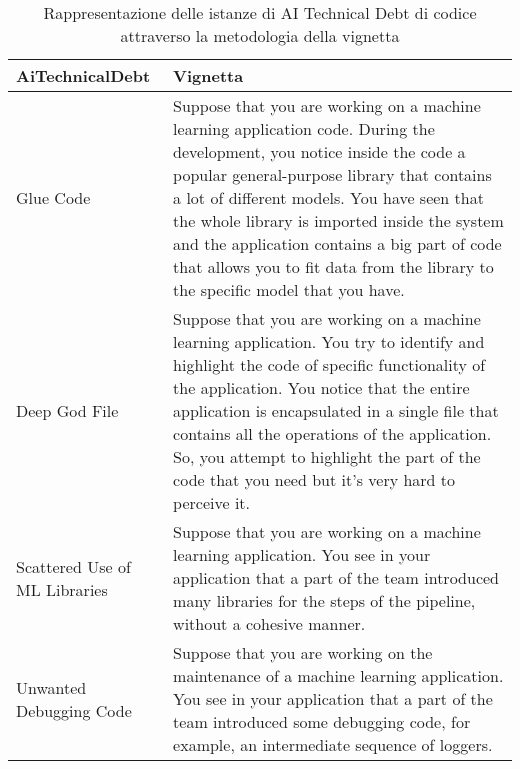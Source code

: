 \begin{table}[h]
    \centering
    \scriptsize
    \begin{tabular}{|l|p{6cm}|}
    \hline
        \textbf{AiTechnicalDebt} & \textbf{Vignetta}\\
        \hline
         Glue Code & Suppose that you are working on a machine learning application code. During the development, you notice inside the code a popular general-purpose library that contains a lot of different models. You have seen that the whole library is imported inside the system and the application contains a big part of code that allows you to fit data from the library to the specific model that you have.\\
             \hline
         Deep God File & Suppose that you are working on a machine learning application. You try to identify and highlight the code of specific functionality of the application. You notice that the entire application is encapsulated in a single file that contains all the operations of the application. So, you attempt to highlight the part of the code that you need but it's very hard to perceive it.\\
             \hline
         Scattered Use of ML Libraries & Suppose that you are working on a machine learning application. You see in your application that a part of the team introduced many libraries for the steps of the pipeline, without a cohesive manner.\\
            \hline
         Unwanted Debugging Code & Suppose that you are working on the maintenance of a machine learning application. You see in your application that a part of the team introduced some debugging code, for example, an intermediate sequence of loggers.\\
         \hline
    \end{tabular}
    \caption{Rappresentazione delle istanze di AI Technical Debt di codice attraverso la metodologia della vignetta}
    \label{tab:aitd_c_vignetta}
\end{table}

